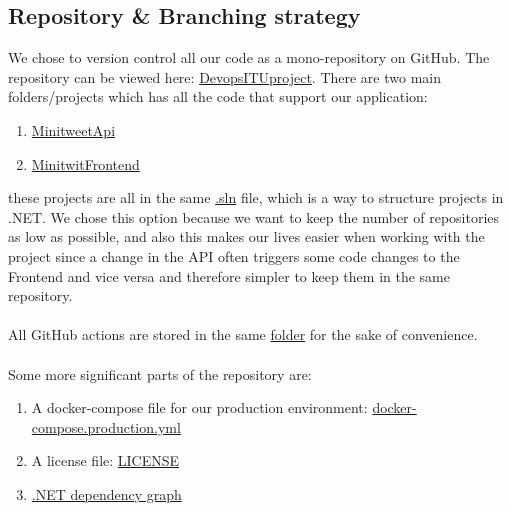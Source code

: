 \documentclass[10pt]{article}
\begin{document}
\subsection{Repository \& Branching strategy}
We chose to version control all our code as a mono-repository on GitHub. The repository can be viewed here: \href{https://github.com/Arklaide/devopsITUproject}{DevopsITUproject}.
There are two main folders/projects which has all the code that support our application:
\begin{enumerate}
    \item \href{https://github.com/Arklaide/devopsITUproject/tree/main/MinitweetApi}{MinitweetApi}
    \item \href{https://github.com/Arklaide/devopsITUproject/tree/main/MinitwitFrontend}{MinitwitFrontend}
\end{enumerate}
these projects are all in the same \href{https://github.com/Arklaide/devopsITUproject/blob/main/Minitweet.sln}{.sln} file, which is a way to structure projects in .NET.
We chose this option because we want to keep the number of repositories as low as possible, and also this makes our lives easier when working with the project since a change in the API often triggers some code changes to the Frontend and vice versa and therefore simpler to keep them in the same repository.
\\
\\
All GitHub actions are stored in the same \href{https://github.com/Arklaide/devopsITUproject/tree/main/.github}{folder} for the sake of convenience.
\\
\\

Some more significant parts of the repository are: %
\begin{enumerate}
    \item A docker-compose file for our production environment: \href{https://github.com/Arklaide/devopsITUproject/blob/main/docker-compose.production.yml}{docker-compose.production.yml}
    \item A license file: \href{https://github.com/Arklaide/devopsITUproject/blob/main/LICENSE}{LICENSE}
    \item \href{https://github.com/Arklaide/devopsITUproject/tree/main/Architecture-info}{.NET dependency graph}
\end{enumerate}
\end{document}
